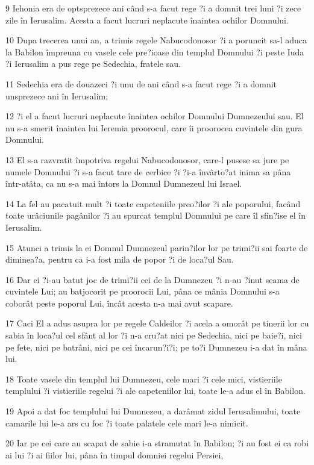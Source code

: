 \par 9 Iehonia era de optsprezece ani când s-a facut rege ?i a domnit trei luni ?i zece zile în Ierusalim. Acesta a facut lucruri neplacute înaintea ochilor Domnului.
\par 10 Dupa trecerea unui an, a trimis regele Nabucodonosor ?i a poruncit sa-l aduca la Babilon împreuna cu vasele cele pre?ioase din templul Domnului ?i peste Iuda ?i Ierusalim a pus rege pe Sedechia, fratele sau.
\par 11 Sedechia era de douazeci ?i unu de ani când s-a facut rege ?i a domnit unsprezece ani în Ierusalim;
\par 12 ?i el a facut lucruri neplacute înaintea ochilor Domnului Dumnezeului sau. El nu s-a smerit înaintea lui Ieremia proorocul, care îi proorocea cuvintele din gura Domnului.
\par 13 El s-a razvratit împotriva regelui Nabucodonosor, care-l pusese sa jure pe numele Domnului ?i s-a facut tare de cerbice ?i ?i-a învârto?at inima sa pâna într-atâta, ca nu s-a mai întors la Domnul Dumnezeul lui Israel.
\par 14 La fel au pacatuit mult ?i toate capeteniile preo?ilor ?i ale poporului, facând toate urâciunile pagânilor ?i au spurcat templul Domnului pe care îl sfin?ise el în Ierusalim.
\par 15 Atunci a trimis la ei Domnul Dumnezeul parin?ilor lor pe trimi?ii sai foarte de diminea?a, pentru ca i-a fost mila de popor ?i de loca?ul Sau.
\par 16 Dar ei ?i-au batut joc de trimi?ii cei de la Dumnezeu ?i n-au ?inut seama de cuvintele Lui; au batjocorit pe proorocii Lui, pâna ce mânia Domnului s-a coborât peste poporul Lui, încât acesta n-a mai avut scapare.
\par 17 Caci El a adus asupra lor pe regele Caldeilor ?i acela a omorât pe tinerii lor cu sabia în loca?ul cel sfânt al lor ?i n-a cru?at nici pe Sedechia, nici pe baie?i, nici pe fete, nici pe batrâni, nici pe cei încarun?i?i; pe to?i Dumnezeu i-a dat în mâna lui.
\par 18 Toate vasele din templul lui Dumnezeu, cele mari ?i cele mici, vistieriile templului ?i vistieriile regelui ?i ale capeteniilor lui, toate le-a adus el în Babilon.
\par 19 Apoi a dat foc templului lui Dumnezeu, a darâmat zidul Ierusalimului, toate camarile lui le-a ars cu foc ?i toate palatele cele mari le-a nimicit.
\par 20 Iar pe cei care au scapat de sabie i-a stramutat în Babilon; ?i au fost ei ca robi ai lui ?i ai fiilor lui, pâna în timpul domniei regelui Persiei,
